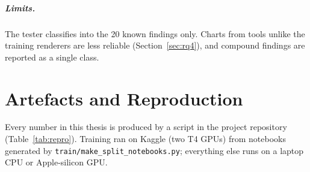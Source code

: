 \paragraph{Limits.} The tester classifies into the 20 known findings only. Charts from
tools unlike the training renderers are less reliable (Section~\ref{sec:rq4}), and
compound findings are reported as a single class.

\chapter{Artefacts and Reproduction}
\label{app:repro}

Every number in this thesis is produced by a script in the project repository
(Table~\ref{tab:repro}). Training ran on Kaggle (two T4 GPUs) from notebooks generated
by \texttt{train/make\_split\_notebooks.py}; everything else runs on a laptop CPU or
Apple-silicon GPU.

